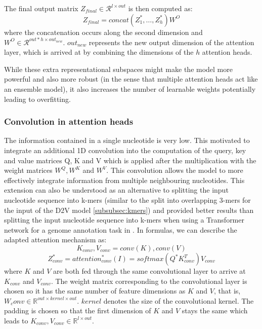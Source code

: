 The final output matrix $Z_{final} \in \mathcal{R}^{l \times out}$ is then computed as:
$$Z_{final} = concat(Z_1^*, \dots, Z_{h}^*) W^O$$
where the concatenation occurs along the second dimension and $W^O \in \mathcal{R}^{out * h \times out_{new}}$. $out_{new}$ represents the new output dimension of the attention layer, which is arrived at by combining the dimensions of the $h$ attention heads.

While these extra representational subspaces might make the model more powerful and also more robust (in the sense that multiple attention heads act like an ensemble model), it also increases the number of learnable weights potentially leading to overfitting.
\subsubsection{Convolution in attention heads} \label{subsubsec:attention_conv}
The information contained in a single nucleotide is very low. 
This motivated \cite{ghentransformers} to integrate an additional 1D convolution into the computation of the query, key and value matrices Q, K and V which is applied after the multiplication with the weight matrices $W^Q, W^K$ and $W^V$. This convolution allows the model to more effectively integrate information from multiple neighbouring nucleotides. This extension can also be understood as an alternative to splitting the input nucleotide sequence into k-mers (similar to the split into overlapping 3-mers for the input of the D2V model \ref{subsubsec:kmers}) and provided better results than splitting the input nucleotide sequence into k-mers when using a Transformer network for a genome annotation task in \cite{ghentransformers}.
In formulas, we can describe the adapted attention mechanism as:
$$K_{conv}, V_{conv} = conv(K), conv(V)$$
$$Z^*_{conv} = {attention}_{conv}^*(I) = softmax({Q}^*K_{conv}^T)V_{conv}$$
where $K$ and $V$ are both fed through the same convolutional layer to arrive at $K_{conv}$ and $V_{conv}$. The weight matrix corresponding to the convolutional layer is chosen so it has the same number of feature dimensions as $K$ and $V$, that is, $W_conv \in \mathbb{R}^{out \times kernel \times out}$. $kernel$ denotes the size of the convolutional kernel. 
The padding is chosen so that the first dimension of $K$ and $V$ stays the same which leads to $K_{conv}, V_{conv} \in \mathbb{R}^{l \times out}$.

